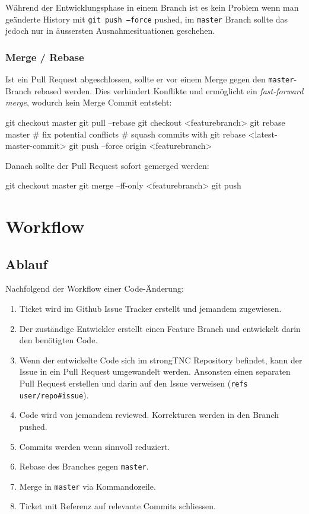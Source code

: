 Während der Entwicklungsphase in einem Branch ist es kein Problem wenn man
geänderte History mit \texttt{git push --force} pushed, im \texttt{master}
Branch sollte das jedoch nur in äussersten Ausnahmesituationen geschehen.

\subsubsection{Merge / Rebase}

Ist ein Pull Request abgeschlossen, sollte er vor einem Merge gegen den
\texttt{master}-Branch rebased werden. Dies verhindert Konflikte und ermöglicht
ein \textit{fast-forward merge}, wodurch kein Merge Commit entsteht:

\begin{bashcode}
git checkout master
git pull --rebase
git checkout <featurebranch>
git rebase master
# fix potential conflicts
# squash commits with git rebase <latest-master-commit>
git push --force origin <featurebranch>
\end{bashcode}

\noindent Danach sollte der Pull Request sofort gemerged werden:

\begin{bashcode}
git checkout master
git merge --ff-only <featurebranch>
git push
\end{bashcode}


\section{Workflow}

\subsection{Ablauf}

Nachfolgend der Workflow einer Code-Änderung:

\begin{enumerate}
	\item Ticket wird im Github Issue Tracker erstellt und jemandem zugewiesen.
	\item Der zuständige Entwickler erstellt einen Feature Branch und entwickelt
		darin den benötigten Code.
	\item Wenn der entwickelte Code sich im strongTNC Repository befindet, kann
		der Issue in ein Pull Request umgewandelt werden. Ansonsten einen separaten
		Pull Request erstellen und darin auf den Issue verweisen (\texttt{refs
		user/repo\#issue}).
	\item Code wird von jemandem reviewed. Korrekturen werden in den Branch
		pushed.
	\item Commits werden wenn sinnvoll reduziert.
	\item Rebase des Branches gegen \texttt{master}.
	\item Merge in \texttt{master} via Kommandozeile.
	\item Ticket mit Referenz auf relevante Commits schliessen.
\end{enumerate}

